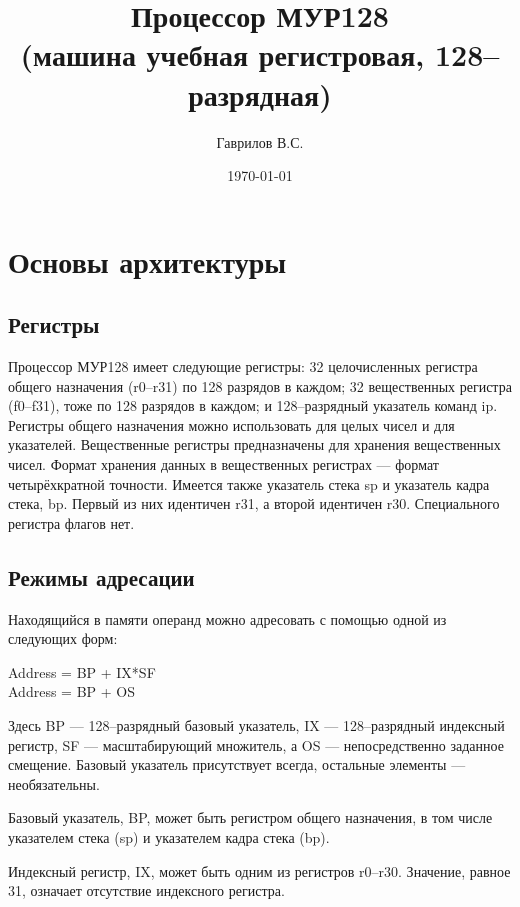 \documentclass[10pt]{report}
\begin{document}
\title{Процессор МУР128\\ (машина учебная регистровая, 128--разрядная)}
\author{Гаврилов В.С.}
\date{\today}
\maketitle

\tableofcontents
\setcounter{secnumdepth}{2}

\listoftables

\chapter{Основы архитектуры}
    \section{Регистры}
Процессор МУР128 имеет следующие регистры: 32 целочисленных регистра общего назначения (r0--r31) по 128 разрядов в каждом; 32 вещественных регистра (f0--f31), тоже по 128 разрядов в каждом; и 128--разрядный указатель команд ip. Регистры общего назначения можно использовать для целых чисел и для указателей. Вещественные регистры предназначены для хранения вещественных чисел. Формат хранения данных в вещественных регистрах --- формат четырёхкратной точности. Имеется также указатель стека sp и указатель кадра стека, bp. Первый из них идентичен r31, а второй идентичен r30. Специального регистра флагов нет.

    \section{Режимы адресации}
Находящийся в памяти операнд можно адресовать с помощью одной из следующих форм:
\vspace{5mm}

\parbox{50mm}{%
Address = BP + IX*SF\\
Address = BP + OS}
\vspace{5mm}

Здесь BP --- 128--разрядный базовый указатель, IX --- 128--разрядный индексный регистр, SF --- масштабирующий множитель, а OS --- непосредственно заданное смещение. Базовый указатель присутствует всегда, остальные элементы --- необязательны.

Базовый указатель, BP, может быть регистром общего назначения, в том числе указателем стека (sp) и указателем кадра стека (bp).

Индексный регистр, IX, может быть одним из регистров r0--r30. Значение, равное 31, означает отсутствие индексного регистра.
\end{document}
